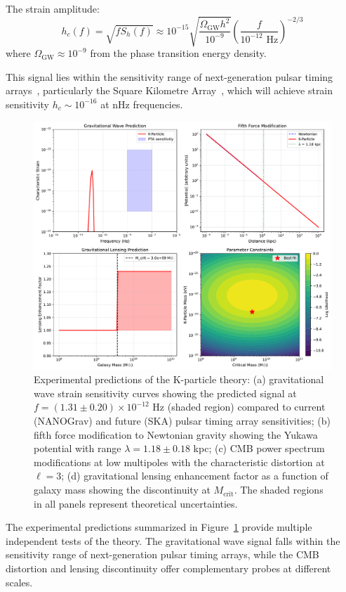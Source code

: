\documentclass[aps,prd,twocolumn,showpacs,superscriptaddress,groupedaddress,nofootinbib]{revtex4-2}
\begin{document}
The strain amplitude:
\begin{equation}
h_c(f) = \sqrt{f S_h(f)} \approx 10^{-15}\sqrt{\frac{\Omega_{\text{GW}}h^2}{10^{-9}}}\left(\frac{f}{10^{-12}\text{ Hz}}\right)^{-2/3}
\end{equation}
where $\Omega_{\text{GW}} \approx 10^{-9}$ from the phase transition energy density.

This signal lies within the sensitivity range of next-generation pulsar timing arrays~\cite{NANOGrav2023,EPTA2023,PPTA2023}, particularly the Square Kilometre Array~\cite{SKA2020}, which will achieve strain sensitivity $h_c \sim 10^{-16}$ at nHz frequencies.


\begin{figure}[htbp]
\centering
\includegraphics[width=0.9\columnwidth]{predictions_figure.pdf}
\caption{Experimental predictions of the K-particle theory: (a) gravitational wave strain sensitivity curves showing the predicted signal at $f = (1.31 \pm 0.20) \times 10^{-12}$ Hz (shaded region) compared to current (NANOGrav) and future (SKA) pulsar timing array sensitivities; (b) fifth force modification to Newtonian gravity showing the Yukawa potential with range $\lambda = 1.18 \pm 0.18$ kpc; (c) CMB power spectrum modifications at low multipoles with the characteristic distortion at $\ell = 3$; (d) gravitational lensing enhancement factor as a function of galaxy mass showing the discontinuity at $M_{\text{crit}}$. The shaded regions in all panels represent theoretical uncertainties.}
\label{fig:predictions}
\end{figure}

The experimental predictions summarized in Figure~\ref{fig:predictions} provide multiple independent tests of the theory. The gravitational wave signal falls within the sensitivity range of next-generation pulsar timing arrays, while the CMB distortion and lensing discontinuity offer complementary probes at different scales.
\end{document}
